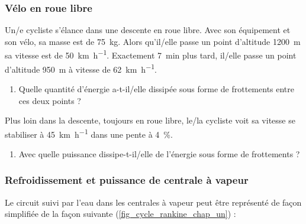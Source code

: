 
\subsubsection{Vélo en roue libre}
\label{exo_velo_roue_libre}
	
	Un/e cycliste s’élance dans une descente en roue libre. Avec son équipement et son vélo, sa masse est de \SI{75}{\kilogram}. Alors qu’il/elle passe un point d’altitude \SI{1200}{\metre} sa vitesse est de \SI[per-mode = symbol]{50}{\kilo\metre\per\hour}. Exactement \SI{7}{\minute} plus tard, il/elle passe un point d’altitude \SI{950}{\metre} à vitesse de \SI[per-mode=symbol]{62}{\kilo\metre\per\hour}.
	
	\begin{enumerate}
		\item Quelle quantité d’énergie a-t-il/elle dissipée sous forme de frottements entre ces deux points ?
	\end{enumerate}
	
	Plus loin dans la descente, toujours en roue libre, le/la cycliste voit sa vitesse se stabiliser à \SI{45}{\kilo\metre\per\hour} dans une pente à \SI{4}{\percent}.
	
	\begin{enumerate}
		\item Avec quelle puissance dissipe-t-il/elle de l’énergie sous forme de frottements ?
	\end{enumerate}


\subsubsection{Refroidissement et puissance de centrale à vapeur}
\label{exo_refroidissement_centrale_vapeur}

	Le circuit suivi par l’eau dans les centrales à vapeur peut être représenté de façon simplifiée de la façon suivante (\cref{fig_cycle_rankine_chap_un}) :
	
